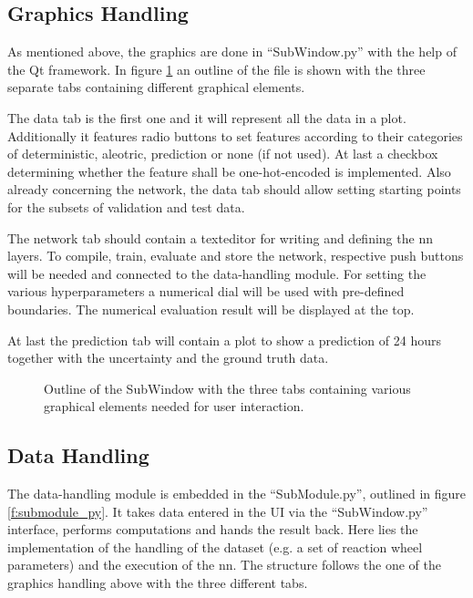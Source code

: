 		\subsection{Graphics Handling}
		As mentioned above, the graphics are done in \enquote{SubWindow.py} with the help of the Qt framework.	In figure \ref{f:subwindow_py} an outline of the file is shown with the three separate tabs containing different graphical elements. 
		
		The data tab is the first one and it will represent all the data in a plot. Additionally it features radio buttons to set features according to their categories of deterministic, aleotric, prediction or none (if not used). At last a checkbox determining whether the feature shall be one-hot-encoded is implemented. Also already concerning the network, the data tab should allow setting starting points for the subsets of validation and test data. 
		
		The network tab should contain a texteditor for writing and defining the \ac{nn} layers. To compile, train, evaluate and store the network, respective push buttons will be needed and connected to the data-handling module. For setting the various hyperparameters a numerical dial will be used with pre-defined boundaries. The numerical evaluation result will be displayed at the top.
		
		At last the prediction tab will contain a plot to show a prediction of 24 hours together with the uncertainty and the ground truth data. 

		\begin{figure}[htb]
		\centering
		
		\caption{Outline of the SubWindow with the three tabs containing various graphical elements needed for user interaction.}
		\label{f:subwindow_py}
		\end{figure}
			
		\subsection{Data Handling}
		The data-handling module is embedded in the \enquote{SubModule.py}, outlined in figure \ref{f:submodule_py}. It takes data entered in the UI via the \enquote{SubWindow.py} interface, performs computations and hands the result back. Here lies the implementation of the handling of the dataset (e.g. a set of reaction wheel parameters) and the execution of the \ac{nn}. The structure follows the one of the graphics handling above with the three different tabs.
		
